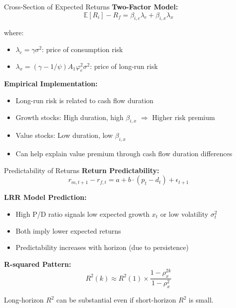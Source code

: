 \documentclass{beamer}
\newcommand{\E}{\mathbb{E}}
\begin{document}
\begin{frame}{Cross-Section of Expected Returns}
    \textbf{Two-Factor Model:}
    \begin{equation}
        \E[R_i] - R_f = \beta_{i,c} \lambda_c + \beta_{i,x} \lambda_x
    \end{equation}
    
    where:
    \begin{itemize}
        \item $\lambda_c = \gamma \sigma^2$: price of consumption risk
        \item $\lambda_x = (\gamma - 1/\psi) A_1 \varphi_e^2 \sigma^2$: price of long-run risk
    \end{itemize}
    
    \vspace{0.3cm}
    \textbf{Empirical Implementation:}
    \begin{itemize}
        \item Long-run risk is related to cash flow duration
        \item Growth stocks: High duration, high $\beta_{i,x}$ $\Rightarrow$ Higher risk premium
        \item Value stocks: Low duration, low $\beta_{i,x}$
        \item Can help explain value premium through cash flow duration differences
    \end{itemize}
\end{frame}

\begin{frame}{Predictability of Returns}
    \textbf{Return Predictability:}
    \begin{equation}
        r_{m,t+1} - r_{f,t} = a + b \cdot (p_t - d_t) + \epsilon_{t+1}
    \end{equation}
    
    \textbf{LRR Model Prediction:}
    \begin{itemize}
        \item High P/D ratio signals low expected growth $x_t$ or low volatility $\sigma_t^2$
        \item Both imply lower expected returns
        \item Predictability increases with horizon (due to persistence)
    \end{itemize}
    
    \vspace{0.3cm}
    \textbf{R-squared Pattern:}
    \begin{equation}
        R^2(k) \approx R^2(1) \times \frac{1 - \rho_x^{2k}}{1 - \rho_x^2}
    \end{equation}
    
    Long-horizon $R^2$ can be substantial even if short-horizon $R^2$ is small.
\end{frame}
\end{document}
